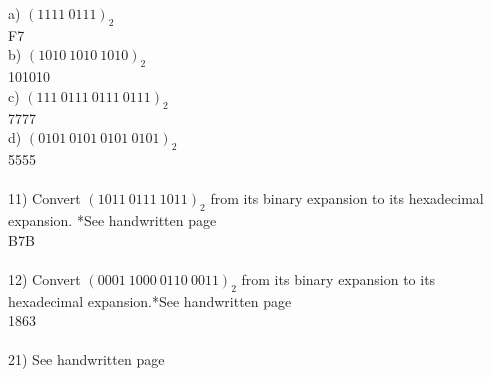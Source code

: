 \documentclass{article}
\begin{document}
\begin{flushleft}
\setlength\parindent{24pt}a) $(1111\:0111)_2$ \\
\setlength\parindent{48pt} F7 \\
\setlength\parindent{24pt}b) $(1010\:1010\:1010)_2$ \\
\setlength\parindent{48pt} 101010 \\
\setlength\parindent{24pt}c) $(111\:0111\:0111\:0111)_2$ \\
\setlength\parindent{48pt} 7777 \\
\setlength\parindent{24pt}d) $(0101\:0101\:0101\:0101)_2$ \\
\setlength\parindent{48pt} 5555 \\
~\\
\setlength\parindent{0pt}11) Convert $(1011\:0111\:1011)_2$ from its binary expansion to its hexadecimal expansion. {\tiny **See handwritten page}\\
\setlength\parindent{24pt} B7B \\
~\\
\setlength\parindent{0pt}12) Convert $(0001\:1000\:0110\:0011)_2$ from its binary expansion to its hexadecimal expansion.{\tiny **See handwritten page}\\
\setlength\parindent{24pt} 1863 \\
~\\
\setlength\parindent{0pt}21) See handwritten page
 

\end{flushleft}
\end{document}
